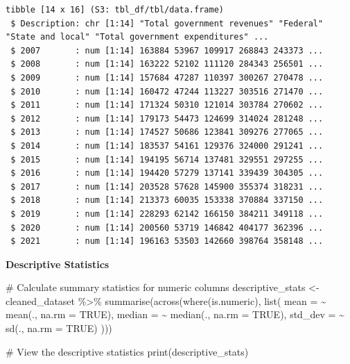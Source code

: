 \documentclass[
  letterpaper,
  DIV=11,
  numbers=noendperiod]{scrreprt}
\newenvironment{Shaded}{\begin{snugshade}}{\end{snugshade}}
\newcommand{\AttributeTok}[1]{\textcolor[rgb]{0.40,0.45,0.13}{#1}}
\newcommand{\CommentTok}[1]{\textcolor[rgb]{0.37,0.37,0.37}{#1}}
\newcommand{\ConstantTok}[1]{\textcolor[rgb]{0.56,0.35,0.01}{#1}}
\newcommand{\FunctionTok}[1]{\textcolor[rgb]{0.28,0.35,0.67}{#1}}
\newcommand{\NormalTok}[1]{\textcolor[rgb]{0.00,0.23,0.31}{#1}}
\newcommand{\OtherTok}[1]{\textcolor[rgb]{0.00,0.23,0.31}{#1}}
\newcommand{\SpecialCharTok}[1]{\textcolor[rgb]{0.37,0.37,0.37}{#1}}
\begin{document}
\begin{verbatim}
tibble [14 x 16] (S3: tbl_df/tbl/data.frame)
 $ Description: chr [1:14] "Total government revenues" "Federal" "State and local" "Total government expenditures" ...
 $ 2007       : num [1:14] 163884 53967 109917 268843 243373 ...
 $ 2008       : num [1:14] 163222 52102 111120 284343 256501 ...
 $ 2009       : num [1:14] 157684 47287 110397 300267 270478 ...
 $ 2010       : num [1:14] 160472 47244 113227 303516 271470 ...
 $ 2011       : num [1:14] 171324 50310 121014 303784 270602 ...
 $ 2012       : num [1:14] 179173 54473 124699 314024 281248 ...
 $ 2013       : num [1:14] 174527 50686 123841 309276 277065 ...
 $ 2014       : num [1:14] 183537 54161 129376 324000 291241 ...
 $ 2015       : num [1:14] 194195 56714 137481 329551 297255 ...
 $ 2016       : num [1:14] 194420 57279 137141 339439 304305 ...
 $ 2017       : num [1:14] 203528 57628 145900 355374 318231 ...
 $ 2018       : num [1:14] 213373 60035 153338 370884 337150 ...
 $ 2019       : num [1:14] 228293 62142 166150 384211 349118 ...
 $ 2020       : num [1:14] 200560 53719 146842 404177 362396 ...
 $ 2021       : num [1:14] 196163 53503 142660 398764 358148 ...
\end{verbatim}

\textbf{Descriptive Statistics}

\begin{Shaded}
\begin{Highlighting}[]
\CommentTok{\# Calculate summary statistics for numeric columns}
\NormalTok{descriptive\_stats }\OtherTok{\textless{}{-}}\NormalTok{ cleaned\_dataset }\SpecialCharTok{\%\textgreater{}\%}
  \FunctionTok{summarise}\NormalTok{(}\FunctionTok{across}\NormalTok{(}\FunctionTok{where}\NormalTok{(is.numeric), }\FunctionTok{list}\NormalTok{(}
    \AttributeTok{mean =} \SpecialCharTok{\textasciitilde{}} \FunctionTok{mean}\NormalTok{(., }\AttributeTok{na.rm =} \ConstantTok{TRUE}\NormalTok{),}
    \AttributeTok{median =} \SpecialCharTok{\textasciitilde{}} \FunctionTok{median}\NormalTok{(., }\AttributeTok{na.rm =} \ConstantTok{TRUE}\NormalTok{),}
    \AttributeTok{std\_dev =} \SpecialCharTok{\textasciitilde{}} \FunctionTok{sd}\NormalTok{(., }\AttributeTok{na.rm =} \ConstantTok{TRUE}\NormalTok{)}
\NormalTok{  )))}

\CommentTok{\# View the descriptive statistics}
\FunctionTok{print}\NormalTok{(descriptive\_stats)}
\end{Highlighting}
\end{Shaded}
\end{document}
